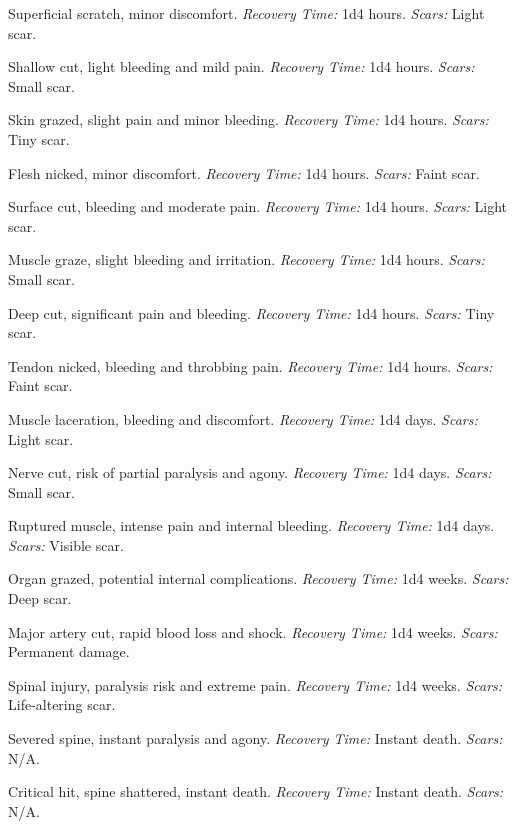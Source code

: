 \begin{description}[labelwidth=1.5em, leftmargin=*, itemsep=0.4em]
    \item[1 -] Superficial scratch, minor discomfort. \textit{Recovery Time:} 1d4 hours. \textit{Scars:} Light scar.
    \item[2 -] Shallow cut, light bleeding and mild pain. \textit{Recovery Time:} 1d4 hours. \textit{Scars:} Small scar.
    \item[3 -] Skin grazed, slight pain and minor bleeding. \textit{Recovery Time:} 1d4 hours. \textit{Scars:} Tiny scar.
    \item[4 -] Flesh nicked, minor discomfort. \textit{Recovery Time:} 1d4 hours. \textit{Scars:} Faint scar.
    \item[5 -] Surface cut, bleeding and moderate pain. \textit{Recovery Time:} 1d4 hours. \textit{Scars:} Light scar.
    \item[6 -] Muscle graze, slight bleeding and irritation. \textit{Recovery Time:} 1d4 hours. \textit{Scars:} Small scar.
    \item[7 -] Deep cut, significant pain and bleeding. \textit{Recovery Time:} 1d4 hours. \textit{Scars:} Tiny scar.
    \item[8 -] Tendon nicked, bleeding and throbbing pain. \textit{Recovery Time:} 1d4 hours. \textit{Scars:} Faint scar.
    \item[9 -] Muscle laceration, bleeding and discomfort. \textit{Recovery Time:} 1d4 days. \textit{Scars:} Light scar.
    \item[10 -] Nerve cut, risk of partial paralysis and agony. \textit{Recovery Time:} 1d4 days. \textit{Scars:} Small scar.
    \item[11 -] Ruptured muscle, intense pain and internal bleeding. \textit{Recovery Time:} 1d4 days. \textit{Scars:} Visible scar.
    \item[12 -] Organ grazed, potential internal complications. \textit{Recovery Time:} 1d4 weeks. \textit{Scars:} Deep scar.
    \item[13 -] Major artery cut, rapid blood loss and shock. \textit{Recovery Time:} 1d4 weeks. \textit{Scars:} Permanent damage.
    \item[14 -] Spinal injury, paralysis risk and extreme pain. \textit{Recovery Time:} 1d4 weeks. \textit{Scars:} Life-altering scar.
    \item[15 -] Severed spine, instant paralysis and agony. \textit{Recovery Time:} Instant death. \textit{Scars:} N/A.
    \item[16 -] Critical hit, spine shattered, instant death. \textit{Recovery Time:} Instant death. \textit{Scars:} N/A.

\end{description}
